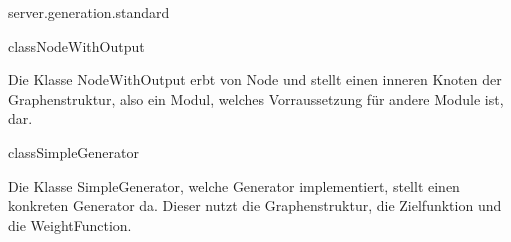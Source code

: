 \begin{texdocpackage}{server.generation.standard}
\begin{texdocclass}{class}{NodeWithOutput}
\label{texdoclet:edu.kit.informatik.studyplan.server.generation.standard.NodeWithOutput}
\begin{texdocclassintro}
Die Klasse NodeWithOutput erbt von Node und stellt einen 
 inneren Knoten der Graphenstruktur, also ein Modul, welches Vorraussetzung
 für andere Module ist, dar.\end{texdocclassintro}
\begin{texdocclassconstructors}
\end{texdocclassconstructors}
\begin{texdocclassmethods}
\end{texdocclassmethods}
\end{texdocclass}


\begin{texdocclass}{class}{SimpleGenerator}
\label{texdoclet:edu.kit.informatik.studyplan.server.generation.standard.SimpleGenerator}
\begin{texdocclassintro}
Die Klasse SimpleGenerator, welche Generator implementiert,
 stellt einen konkreten Generator da. Dieser nutzt die Graphenstruktur, 
 die Zielfunktion und die WeightFunction.\end{texdocclassintro}
\begin{texdocclassconstructors}
\end{texdocclassconstructors}
\begin{texdocclassmethods}
\end{texdocclassmethods}
\end{texdocclass}



\end{texdocpackage}
